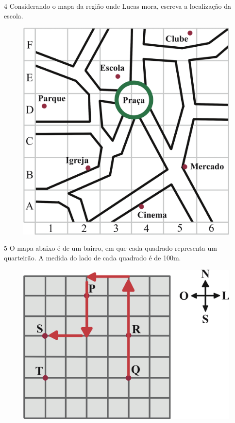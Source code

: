 \pagebreak
\num{4} Considerando o mapa da região onde Lucas mora, escreva a localização
da escola.

\begin{figure}[htpb!]
\centering
\includegraphics[width=\textwidth]{./ilustras-mat/modulo_12-atividade_4.png}
\end{figure}


\pagebreak
\num{5} O mapa abaixo é de um bairro, em que cada quadrado representa um
quarteirão. A medida do lado de cada quadrado é de 100m.

\begin{figure}[htpb!]
\centering
\includegraphics[width=.8\textwidth]{./ilustras-mat/modulo_12-atividade_5_resposta.png}
\end{figure}


